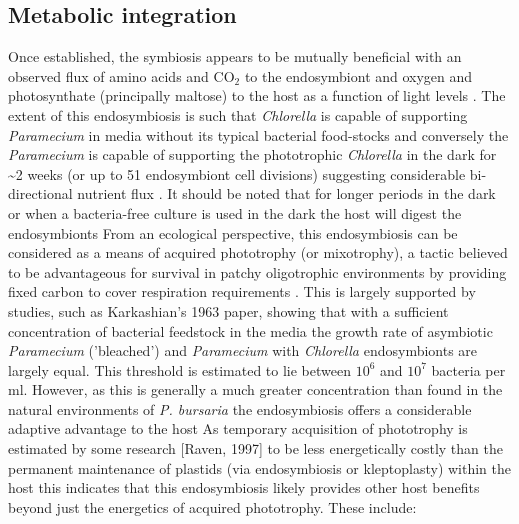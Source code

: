 \subsection{Metabolic integration}
Once established, the symbiosis appears to be mutually beneficial with an observed flux of amino acids and CO$_{2}$ to the endosymbiont and oxygen and photosynthate (principally maltose) to the host as a function of light levels \citep{Karkashian1963}.
The extent of this endosymbiosis is such that \textit{Chlorella} is capable of supporting \textit{Paramecium} in media without its typical bacterial food-stocks and conversely the \textit{Paramecium} is capable of supporting the phototrophic \textit{Chlorella} in the dark for \textasciitilde 2 weeks (or up to 51 endosymbiont cell divisions) suggesting considerable bi-directional nutrient flux \citep{Siegel1960,Karkashian1963}.
It should be noted that for longer periods in the dark or when a bacteria-free culture is used in the dark the host will digest the endosymbionts \citep{Parker1927}
From an ecological perspective, this endosymbiosis can be considered as a means of acquired phototrophy (or mixotrophy), a tactic believed to be advantageous for survival in patchy oligotrophic environments by providing fixed carbon to cover respiration requirements \citep{Putt1990}.
This is largely supported by studies, such as Karkashian's 1963 paper, showing that with a sufficient concentration of bacterial feedstock in the media the growth rate of asymbiotic \textit{Paramecium} ('bleached') and \textit{Paramecium} with \textit{Chlorella} endosymbionts are largely equal.
This threshold is estimated to lie between $10^{6}$ and $10^{7}$ bacteria per ml.  
However, as this is generally a much greater concentration than found in the natural environments of \textit{P. bursaria} the endosymbiosis offers a considerable adaptive advantage to the host \citep{Karkashian1963}
As temporary acquisition of phototrophy is estimated by some research [Raven, 1997] to be less energetically costly than the permanent maintenance of plastids (via endosymbiosis or kleptoplasty) within the host this indicates that this endosymbiosis likely provides other host benefits beyond just the energetics of acquired phototrophy. These include: 
